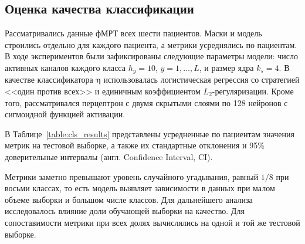 \subsection{Оценка качества классификации}\label{sec4:cls_results}

Рассматривались данные фМРТ всех шести пациентов. Маски и модель строились отдельно для каждого пациента, а метрики усреднялись по пациентам. В ходе экспериментов были зафиксированы следующие параметры модели: число активных каналов каждого класса $h_y = 10$, $y = 1, \ldots, L$, и размер ядра $k_s = 4$. В качестве классификатора $\boldsymbol{\eta}$ использовалась логистическая регрессия со стратегией <<один против всех>> и единичным коэффициентом $L_2$-регуляризации. Кроме того, рассматривался перцептрон с двумя скрытыми слоями по 128 нейронов с сигмоидной функцией активации.

В Таблице~\ref{table:cls_results} представлены усредненные по пациентам значения метрик на тестовой выборке, а также их стандартные отклонения и 95\% доверительные интервалы (англ. Confidence Interval, CI).

\begin{table}[h!]
    \centering
    \caption{Средние значения метрик по пациентам на тестовой выборке, включая стандартные отклонения и 95\% доверительные интервалы}\label{table:cls_results}
\end{table}

Метрики заметно превышают уровень случайного угадывания, равный $1/8$ при восьми классах, то есть модель выявляет зависимости в данных при малом объеме выборки и большом числе классов. Для дальнейшего анализа исследовалось влияние доли обучающей выборки на качество. Для сопоставимости метрики при всех долях вычислялись на одной и той же тестовой выборке.

